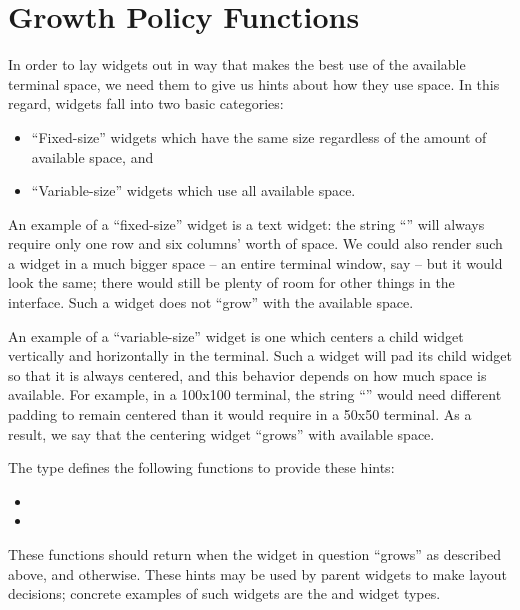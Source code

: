 \section{Growth Policy Functions}
\label{sec:growth_policy_functions}

In order to lay widgets out in way that makes the best use of the
available terminal space, we need them to give us hints about how they
use space.  In this regard, widgets fall into two basic categories:

\begin{itemize}
\item ``Fixed-size'' widgets which have the same size regardless of
  the amount of available space, and
\item ``Variable-size'' widgets which use all available space.
\end{itemize}

An example of a ``fixed-size'' widget is a text widget: the string
``'' will always require only one row and six columns'
worth of space.  We could also render such a widget in a much bigger
space -- an entire terminal window, say -- but it would look the same;
there would still be plenty of room for other things in the interface.
Such a widget does not ``grow'' with the available space.

An example of a ``variable-size'' widget is one which centers a child
widget vertically and horizontally in the terminal.  Such a widget
will pad its child widget so that it is always centered, and this
behavior depends on how much space is available.  For example, in a
100x100 terminal, the string ``'' would need different
padding to remain centered than it would require in a 50x50 terminal.
As a result, we say that the centering widget ``grows'' with available
space.

The  type defines the following functions to provide
these hints:

\begin{itemize}
\item {}
\item {}
\end{itemize}

These functions should return  when the widget in question
``grows'' as described above, and  otherwise.  These hints
may be used by parent widgets to make layout decisions; concrete
examples of such widgets are the  and  widget
types.

